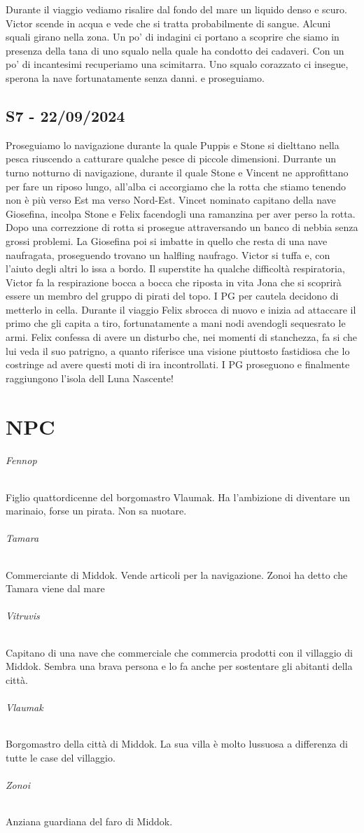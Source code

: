 \documentclass[letterpaper,twocolumn,openany, nodeprecatedcode, nomultitoc]{dndbook}
\begin{document}
Durante il viaggio vediamo risalire dal fondo del mare un liquido denso e scuro. Victor scende in acqua e vede che si tratta probabilmente di sangue. Alcuni squali girano nella zona. Un po' di indagini ci portano a scoprire che siamo in presenza della tana di uno squalo nella quale ha condotto dei cadaveri. Con un po' di incantesimi recuperiamo una scimitarra. Uno squalo corazzato ci insegue, sperona la nave fortunatamente senza danni. e proseguiamo.

\section{S7 - 22/09/2024}
Proseguiamo lo navigazione durante la quale Puppis e Stone si dielttano nella pesca riuscendo a catturare qualche pesce di piccole dimensioni. Durrante un turno notturno di navigazione, durante il quale Stone e Vincent ne approfittano per fare un riposo lungo, all'alba ci accorgiamo che la rotta che stiamo tenendo non è più verso Est ma verso Nord-Est. Vincet nominato capitano della nave Giosefina, incolpa Stone e Felix facendogli una ramanzina per aver perso la rotta. Dopo una correzzione di rotta si prosegue attraversando un banco di nebbia senza grossi problemi. La Giosefina poi si imbatte in quello che resta di una nave naufragata, proseguendo trovano un halfling naufrago. Victor si tuffa e, con l'aiuto degli altri lo issa a bordo. Il superstite ha qualche difficoltà respiratoria, Victor fa la respirazione bocca a bocca che riposta in vita Jona che si scoprirà essere un membro del gruppo di pirati del topo. I PG per cautela decidono di metterlo in cella.
Durante il viaggio Felix sbrocca di nuovo e inizia ad attaccare il primo che gli capita a tiro, fortunatamente a mani nodi avendogli sequesrato le armi. Felix confessa di avere un disturbo che, nei momenti di stanchezza, fa si che lui veda il suo patrigno, a quanto riferisce una visione piuttosto fastidiosa che lo costringe ad avere questi moti di ira incontrollati.
I PG proseguono e finalmente raggiungono l'isola dell Luna Nascente! 


\chapter{NPC}

\subparagraph{Fennop} Figlio quattordicenne del borgomastro Vlaumak. Ha l'ambizione di diventare un marinaio, forse un pirata. Non sa nuotare.

\subparagraph{Tamara} Commerciante di Middok. Vende articoli per la navigazione. Zonoi ha detto che Tamara viene dal mare

\subparagraph{Vitruvis} Capitano di una nave che commerciale che commercia prodotti con il villaggio di Middok. Sembra una brava persona e lo fa anche per sostentare gli abitanti della città.

\subparagraph{Vlaumak} Borgomastro della città di Middok. La sua villa è molto lussuosa a differenza di tutte le case del villaggio.

\subparagraph{Zonoi} Anziana guardiana del faro di Middok.
\end{document}
